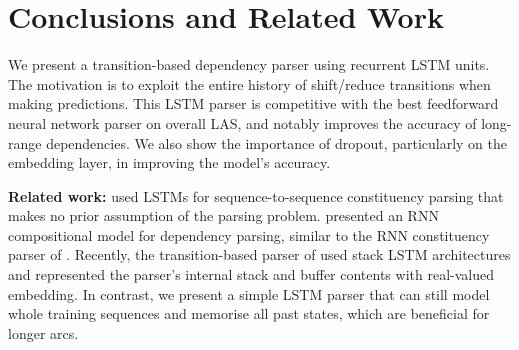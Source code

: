 


\section{Conclusions and Related Work}

We present a transition-based dependency parser using recurrent LSTM units. The motivation is to exploit the entire history of shift/reduce transitions when making predictions. This LSTM parser is competitive with the best feedforward neural network parser \cite{chenmanning14} on overall LAS, and notably improves the accuracy of long-range dependencies. We also show the importance of dropout, particularly on the embedding layer, in improving the model's accuracy.%

{\bf Related work:} %
 used LSTMs for sequence-to-sequence constituency parsing that makes no prior assumption of the parsing problem.
 presented an RNN compositional model for dependency parsing, similar to the RNN constituency parser of . 
Recently, the transition-based parser of  used stack LSTM architectures and represented the parser's internal stack and buffer contents with real-valued embedding.
In contrast, we present a simple LSTM parser that can still model whole training sequences and memorise all past states, which are beneficial for longer arcs. 





